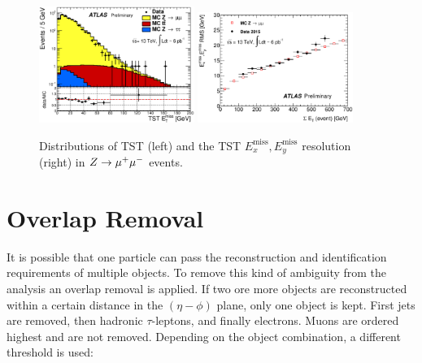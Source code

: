 \begin{figure}[htb]
    \begin{center}
        \includegraphics[width=0.45\textwidth]{./figures/object_selection/etmiss_performance_tst_zmm.eps}
        \includegraphics[width=0.45\textwidth]{./figures/object_selection/etmiss_resolution_tst_zmm.eps}
        \caption{Distributions of TST \etmiss{} (left) and the TST $E^\text{miss}_x, E^\text{miss}_y$ resolution (right)
        in $Z \to \mu^+\mu^-$ events.~\cite{ATL-PHYS-PUB-2015-027}}\label{fig:object_selection:etmiss}
    \end{center}
\end{figure}

\section{Overlap Removal}\label{sec:object_selection:overlap_removal}

It is possible that one particle can pass the reconstruction and identification requirements of multiple objects.
To remove this kind of ambiguity from the analysis an overlap removal is applied.
If two ore more objects are reconstructed within a certain distance \dr{} in the $(\eta - \phi)$ plane, only one object is kept.
First jets are removed, then hadronic $\tau$-leptons, and finally electrons.
Muons are ordered highest and are not removed.
Depending on the object combination, a different \dr{} threshold is used:

